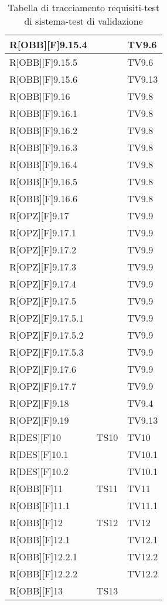 	\begin{table}[h]
		\begin{tabular}{|p{}|p{}|p{}|}
			\midrule


			R[OBB][F]9.15.4 &  & TV9.6 \\ \midrule
			R[OBB][F]9.15.5 &  & TV9.6 \\ \midrule
			R[OBB][F]9.15.6 &  & TV9.13 \\ \midrule
			R[OBB][F]9.16 &  & TV9.8 \\ \midrule
			R[OBB][F]9.16.1 &  & TV9.8 \\ \midrule
			R[OBB][F]9.16.2 &  & TV9.8 \\ \midrule
			R[OBB][F]9.16.3 &  & TV9.8 \\ \midrule
			R[OBB][F]9.16.4 &  & TV9.8 \\ \midrule
			R[OBB][F]9.16.5 &  & TV9.8 \\ \midrule
			R[OBB][F]9.16.6 &  & TV9.8 \\ \midrule
			R[OPZ][F]9.17 &  & TV9.9 \\ \midrule
			R[OPZ][F]9.17.1 &  & TV9.9 \\ \midrule
			R[OPZ][F]9.17.2 &  & TV9.9 \\ \midrule
			R[OPZ][F]9.17.3 &  & TV9.9 \\ \midrule
			R[OPZ][F]9.17.4 &  & TV9.9 \\ \midrule
			R[OPZ][F]9.17.5 &  & TV9.9 \\ \midrule
			R[OPZ][F]9.17.5.1 &  & TV9.9 \\ \midrule
			R[OPZ][F]9.17.5.2 &  & TV9.9 \\ \midrule
			R[OPZ][F]9.17.5.3 &  & TV9.9 \\ \midrule
			R[OPZ][F]9.17.6 &  & TV9.9 \\ \midrule
			R[OPZ][F]9.17.7 &  & TV9.9 \\ \midrule
			R[OPZ][F]9.18 &  & TV9.4 \\ \midrule
			R[OPZ][F]9.19 &  & TV9.13 \\ \midrule
			R[DES][F]10 & TS10 & TV10 \\ \midrule
			R[DES][F]10.1 &  & TV10.1 \\ \midrule
			R[DES][F]10.2 &  & TV10.1 \\ \midrule
			R[OBB][F]11 & TS11 & TV11  \\ \midrule
			R[OBB][F]11.1 &  & TV11.1 \\ \midrule
			R[OBB][F]12 & TS12 & TV12 \\ \midrule
			R[OBB][F]12.1 &  & TV12.1 \\ \midrule
			R[OBB][F]12.2.1 &  & TV12.2 \\ \midrule
			R[OBB][F]12.2.2 &  & TV12.2 \\ \midrule
			R[OBB][F]13 & TS13 &  \\

	
			\bottomrule
	
		\end{tabular}
		\caption{Tabella di tracciamento requisiti-test di sistema-test di validazione}
	\end{table}
	\newpage